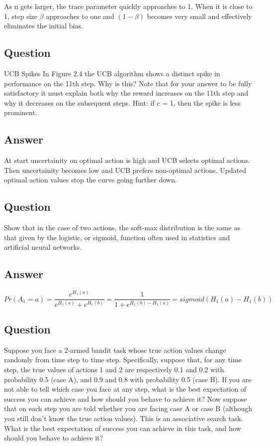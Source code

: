 \documentclass{article}
\begin{document}
    As n gets larger, the trace parameter quickly approaches to 1.
    When it is close to 1, step size $\beta$ approaches to one and $(1-\beta)$ becomes very small and effectively eliminates the initial bias.

    \subsection{Question}
    UCB Spikes In Figure 2.4 the UCB algorithm shows a distinct spike
    in performance on the 11th step. Why is this? Note that for your answer to be fully
    satisfactory it must explain both why the reward increases on the 11th step and why it
    decreases on the subsequent steps. Hint: if c = 1, then the spike is less prominent.

    \subsection*{Answer}
    At start uncertainity on optimal action is high and UCB selects optimal actions. Then uncertainity becomes low and UCB prefers non-optimal actions.
    Updated optimal action values stop the curve going further down.

    \subsection{Question}
    Show that in the case of two actions, the soft-max distribution is the same as that given by the logistic, or sigmoid, function often used in statistics and artificial neural networks.

    \subsection*{Answer}
    \begin{equation}
        Pr(A_1=a)=\frac{e^{H_{1}(a)}}{ e^{H_{1}(a)}+e^{H_{1}(b)} } = \frac{1}{ 1+e^{H_{1}(b)-H_{1}(a)} } = sigmoid(H_{1}(a)-H_{1}(b))
    \end{equation}

    \subsection{Question}
    Suppose you face a 2-armed bandit task whose true action values change randomly from time step to time step.
    Specifically, suppose that, for any time step, the true values of actions 1 and 2 are respectively 0.1 and 0.2 with probability 0.5 (case A), and 0.9 and 0.8 with probability 0.5 (case B).
    If you are not able to tell which case you face at any step, what is the best expectation of success you can achieve and how should you behave to achieve it?
    Now suppose that on each step you are told whether you are facing case A or case B (although you still don’t know the true action values).
    This is an associative search task.
    What is the best expectation of success you can achieve in this task, and how should you behave to achieve it?
\end{document}

